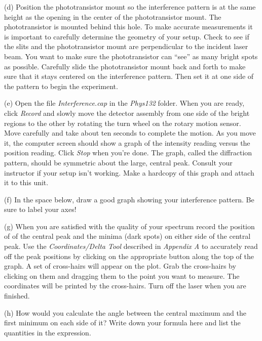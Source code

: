 (d) Position the phototransistor mount so the interference pattern
is at the same height as the opening in the center of the phototransistor mount. 
The phototransistor is mounted behind this hole. 
To make accurate measurements it is important to carefully determine the geometry of your setup. 
Check to see if the slits and the phototransistor mount are perpendicular to the incident
laser beam.  You want to make sure the phototransistor can {}``see'' as many
bright spots as possible. Carefully slide the phototransistor mount 
back and forth to make sure that it stays centered on the interference pattern. 
Then set it at one side of the pattern to begin the experiment.

(e) Open the file {\it Interference.cap} in the {\it Phys132} folder. 
When you are ready, click {\it Record} and slowly move the
detector assembly from one side of the bright regions to the other by rotating the turn wheel on the rotary motion
sensor. Move carefully and take about ten seconds to complete the motion. As you move it, the computer screen
should show a graph of the intensity reading versus the position reading. Click {\it Stop} when you’re done. The
graph, called the diffraction pattern, should be symmetric about the large, central peak. Consult your instructor
if your setup isn’t working.
Make a hardcopy of this graph and attach it to this unit.

(f) In the space below, draw a good graph showing your interference pattern. Be sure to label your axes!
\vspace{25mm}

(g) When you are satisfied with the quality of your spectrum record the 
position of of the central peak and the minima (dark spots) on either side of the central peak.
Use the {\it Coordinates/Delta Tool} 
described in {\it Appendix A} to accurately read off 
the peak positions by clicking on the appropriate button along the top of the 
graph. A set of cross-hairs will appear on the plot. Grab the cross-hairs by 
clicking on them and dragging them to the point you want to measure.
The coordinates will be printed by the cross-hairs.
Turn off the laser when you are finished.
\vspace{25mm}

\newpage

(h) How would you calculate the angle between the central maximum and the first 
minimum on each side of it? Write down your formula here and list the quantities in the expression.
\vspace{25mm}

